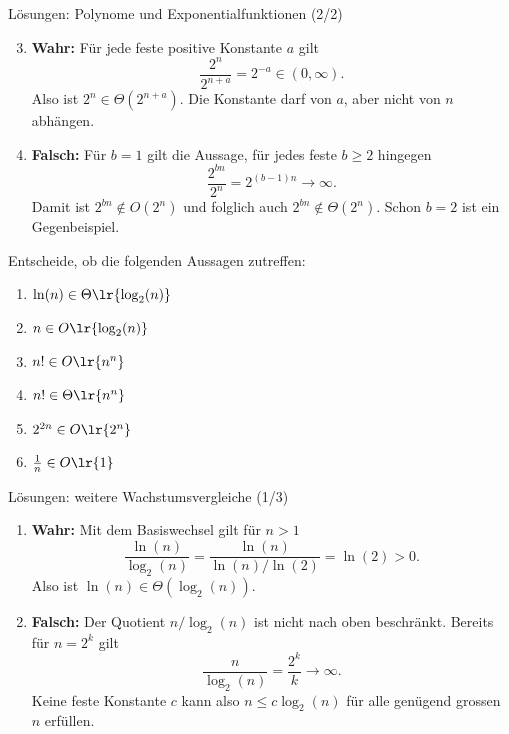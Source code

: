 \begin{frame}{Lösungen: Polynome und Exponentialfunktionen (2/2)}
	\begin{myanswer}
		\begin{enumerate}
			\setcounter{enumi}{2}
			\item \textbf{Wahr:} Für jede feste positive Konstante $a$ gilt
			\[
				\frac{2^n}{2^{n+a}}=2^{-a}\in(0,\infty).
			\]
			Also ist $2^n\in\Theta(2^{n+a})$. Die Konstante darf von $a$, aber nicht von $n$ abhängen.
			\item \textbf{Falsch:} Für $b=1$ gilt die Aussage, für jedes feste $b\geq 2$ hingegen
			\[
				\frac{2^{bn}}{2^n}=2^{(b-1)n}\longrightarrow\infty.
			\]
			Damit ist $2^{bn}\notin O(2^n)$ und folglich auch $2^{bn}\notin\Theta(2^n)$. Schon $b=2$ ist ein Gegenbeispiel.
		\end{enumerate}
	\end{myanswer}
\end{frame}

\begin{frame}
	\begin{myexercise}\label{myexercise:complexity02}
		Entscheide, ob die folgenden Aussagen zutreffen:
		\begin{enumerate}
			\item $\ln(n) \in \Theta\lr{\log_2(n)}$
			\item $n \in O\lr{\log_2(n)}$
			\item $n! \in O\lr{n^n}$
			\item $n! \in \Theta\lr{n^n}$
			\item $2^{2n} \in O\lr{2^n}$
			\item $\frac{1}{n} \in O\lr{1}$
		\end{enumerate}
	\end{myexercise}
\end{frame}

\begin{frame}{Lösungen: weitere Wachstumsvergleiche (1/3)}
	\begin{myanswer}
		\begin{enumerate}
			\item \textbf{Wahr:} Mit dem Basiswechsel gilt für $n>1$
			\[
				\frac{\ln(n)}{\log_2(n)}
				=\frac{\ln(n)}{\ln(n)/\ln(2)}=\ln(2)>0.
			\]
			Also ist $\ln(n)\in\Theta(\log_2(n))$.
			\item \textbf{Falsch:} Der Quotient $n/\log_2(n)$ ist nicht nach oben beschränkt. Bereits für $n=2^k$ gilt
			\[
				\frac{n}{\log_2(n)}=\frac{2^k}{k}\longrightarrow\infty.
			\]
			Keine feste Konstante $c$ kann also $n\leq c\log_2(n)$ für alle genügend grossen $n$ erfüllen.
		\end{enumerate}
	\end{myanswer}
\end{frame}

